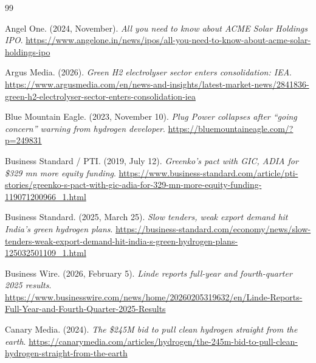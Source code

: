 \newpage
{}
{\small
\let\origsection\section\renewcommand{\section}[2]{}%
\begin{thebibliography}{99}\setlength{\itemsep}{3.2pt}\raggedright

 Angel One. (2024, November). \emph{All you need to know about ACME Solar Holdings IPO}. \url{https://www.angelone.in/news/ipos/all-you-need-to-know-about-acme-solar-holdings-ipo}

 Argus Media. (2026). \emph{Green H2 electrolyser sector enters consolidation: IEA}. \url{https://www.argusmedia.com/en/news-and-insights/latest-market-news/2841836-green-h2-electrolyser-sector-enters-consolidation-iea}

 Blue Mountain Eagle. (2023, November 10). \emph{Plug Power collapses after ``going concern'' warning from hydrogen developer}. \url{https://bluemountaineagle.com/?p=249831}

 Business Standard / PTI. (2019, July 12). \emph{Greenko's pact with GIC, ADIA for \$329 mn more equity funding}. \url{https://www.business-standard.com/article/pti-stories/greenko-s-pact-with-gic-adia-for-329-mn-more-equity-funding-119071200966_1.html}

 Business Standard. (2025, March 25). \emph{Slow tenders, weak export demand hit India's green hydrogen plans}. \url{https://business-standard.com/economy/news/slow-tenders-weak-export-demand-hit-india-s-green-hydrogen-plans-125032501109_1.html}

 Business Wire. (2026, February 5). \emph{Linde reports full-year and fourth-quarter 2025 results}. \url{https://www.businesswire.com/news/home/20260205319632/en/Linde-Reports-Full-Year-and-Fourth-Quarter-2025-Results}

 Canary Media. (2024). \emph{The \$245M bid to pull clean hydrogen straight from the earth}. \url{https://canarymedia.com/articles/hydrogen/the-245m-bid-to-pull-clean-hydrogen-straight-from-the-earth}


\end{thebibliography}}
